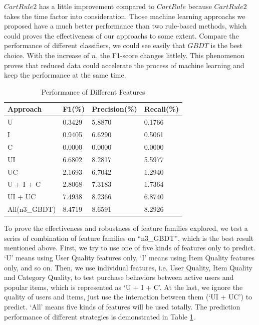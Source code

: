 \documentclass{llncs}
\begin{document}
$CartRule2$ has a little improvement compared to $CartRule$
because $CartRule2$ takes the time factor into consideration.
Those machine learning approachs we proposed have a much better performance
than two rule-based methods, which could proves the effectiveness of our approachs to some extent.
Compare the performance of different classifiers,
we could see easily that $GBDT$ is the best choice.
With the increase of $n$, the F1-score changes littlely.
This phenomenon proves that reduced data could accelerate
the process of machine learning and keep the performance at the same time.

\begin{table}[htbp]
	\normalsize
	\centering
	\caption{Performance of Different Features}
	\begin{tabular}{|p{66pt}|p{60pt}|p{60pt}|p{60pt}|}
		\hline
		Approach & F1(\%) & Precision(\%) & Recall(\%) \\
		\hline
		U & 0.3429 & 5.8870 & 0.1766 \\
		I & 0.9405 & 6.6290 & 0.5061 \\
		C & 0.0000 & 0.0000 & 0.0000 \\
		UI & 6.6802 & 8.2817 & 5.5977 \\
		UC & 2.1693 & 6.7042 & 1.2940 \\
		\hline
		U + I + C & 2.8068 & 7.3183 & 1.7364 \\
		UI + UC & 7.4938 & 8.2366 & 6.8740 \\
		\hline
		All(n3\_GBDT) & 8.4719 & 8.6591 & 8.2926 \\
		\hline
	\end{tabular}
	\label{tab:fea}
\end{table}

To prove the effectiveness and robustness of feature families explored,
we test a series of combination of feature families on 
``n3\_GBDT'', which is the best result mentioned above.
First, we try to use one of five kinds of features only to predict.
`U' means using User Quality features only,
`I' means using Item Quality features only,
and so on.
Then, we use individual features, i.e.
User Quality, Item Quality and Category Quality,
to test purchase behaviors between active users and popular items,
which is represented as `U + I + C'.
At the last, we ignore the quality of users and items,
just use the interaction between them (`UI + UC') to predict.
`All' means five kinds of features will be used totally.
The prediction performance of different strategies is demonstrated in Table \ref{tab:fea}.
\end{document}
